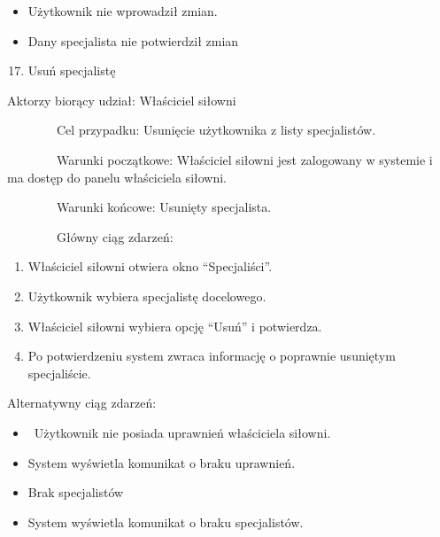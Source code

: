 \documentclass[
]{article}
\providecommand{\tightlist}{%
  \setlength{\itemsep}{0pt}\setlength{\parskip}{0pt}}
\begin{document}
\begin{itemize}
\tightlist
\item
  {Użytkownik nie wprowadził zmian.}
\item
  {Dany specjalista nie potwierdził zmian}
\end{itemize}

{\hfill\break
}

\begin{enumerate}
\setcounter{enumi}{16}
\tightlist
\item
  {Usuń specjalistę}
\end{enumerate}

{Aktorzy biorący udział: Właściciel siłowni}

{~~~~~~~~Cel przypadku: Usunięcie użytkownika z listy specjalistów.}

{~~~~~~~~Warunki początkowe: Właściciel siłowni jest zalogowany w
systemie i ma dostęp do panelu właściciela siłowni.}

{~~~~~~~~Warunki końcowe: Usunięty specjalista.}

{~~~~~~~~Główny ciąg zdarzeń:}

\begin{enumerate}
\tightlist
\item
  {Właściciel siłowni otwiera okno ``Specjaliści''.}
\item
  {Użytkownik wybiera specjalistę docelowego.}
\item
  {Właściciel siłowni wybiera opcję ``Usuń'' i potwierdza.}
\item
  {Po potwierdzeniu system zwraca informację o poprawnie usuniętym
  specjaliście.}
\end{enumerate}

{Alternatywny ciąg zdarzeń:}

\begin{itemize}
\tightlist
\item
  {~Użytkownik nie posiada uprawnień właściciela siłowni.}
\end{itemize}

\begin{itemize}
\tightlist
\item
  {System wyświetla komunikat o braku uprawnień.}
\end{itemize}

\begin{itemize}
\tightlist
\item
  {Brak specjalistów}
\end{itemize}

\begin{itemize}
\tightlist
\item
  {System wyświetla komunikat o braku specjalistów.}
\end{itemize}
\end{document}
